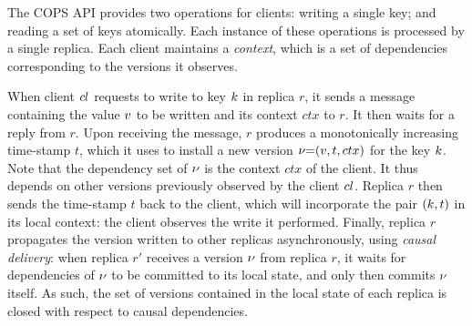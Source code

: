 The COPS API provides two operations for  clients: writing a single
key; and reading 
a set of keys atomically. Each instance of these operations is processed by a single replica. 
Each client maintains a \emph{context}, which is a set of dependencies
corresponding to the versions it observes.  

When client ${cl}$ requests to write to key $k$ in replica $r$, it
sends a message containing the value $v$ to be written and its
context $ctx$ to $r$. It then waits for a reply from $r$. 
Upon receiving the message, $r$ produces a monotonically increasing time-stamp $t$, which it uses to install a new version $\nu {=} (v, t, ctx)$ for the key $k$. 
Note that the dependency set of $\nu$ is the context $ctx$ of the client.
It thus  depends on other versions previously observed by the client ${cl}$. 
Replica $r$ then sends the time-stamp $t$ back to the client, which will incorporate the pair $(k, t)$ in its local context: 
the client observes the write it performed. Finally, replica $r$ propagates the version written to other replicas asynchronously, 
using \emph{causal delivery}: when replica $r'$ receives a version $\nu$ from replica $r$, it 
waits for dependencies of $\nu$ to be committed to its local state, and only then commits $\nu$ itself.
As such, the set of versions contained in the local state of each replica is closed with respect to causal dependencies.
